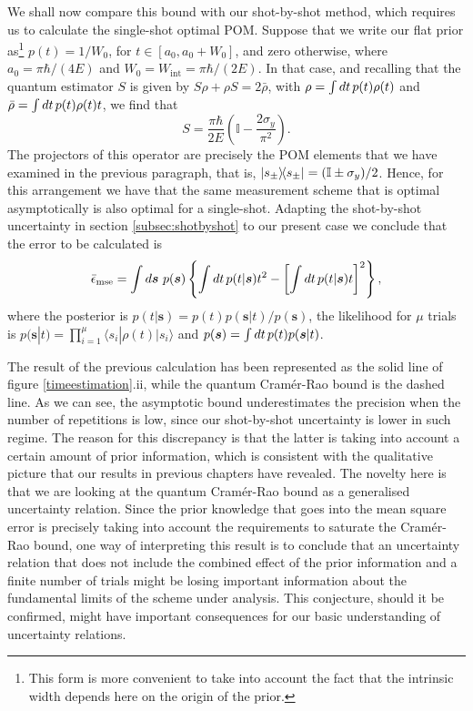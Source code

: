 We shall now compare this bound with our shot-by-shot method, which requires us to calculate the single-shot optimal POM. Suppose that we write our flat prior as\footnote{This form is more convenient to take into account the fact that the intrinsic width depends here on the origin of the prior.} $p(t) = 1/W_0$, for $t\in[a_0,a_0+W_0]$, and zero otherwise, where $a_0 = \pi\hbar/(4E)$ and $W_0 = W_{\mathrm{int}} = \pi\hbar/(2E)$. In that case, and recalling that the quantum estimator $S$ is given by $S\rho + \rho S = 2\bar{\rho}$, with $\rho = \int dt\hspace{0.15em} p(t)\rho(t)$ and $\bar{\rho} = \int dt\hspace{0.15em}p(t)\rho(t)t$, we find that 
\begin{equation}
S = \frac{\pi\hbar}{2E} \left(\mathbb{I}-\frac{2\sigma_y}{\pi^2}\right).
\end{equation}
The projectors of this operator are precisely the POM elements that we have examined in the previous paragraph, that is, $\ketbra{s_\pm} = (\mathbb{I} \pm \sigma_y)/2$. Hence, for this arrangement we have that the same measurement scheme that is optimal asymptotically is also optimal for a single-shot. Adapting the shot-by-shot uncertainty in section \ref{subsec:shotbyshot} to our present case we conclude that the error to be calculated is 
\begin{equation}
\bar{\epsilon}_{\mathrm{mse}} = \int d\boldsymbol{s}~p(\boldsymbol{s}) \left\lbrace \int dt\hspace{0.15em}p(t|\boldsymbol{s}) t^2 - \left[\int dt\hspace{0.15em} p(t|\boldsymbol{s}) t \right]^2 \right\rbrace,
\label{errortime}
\end{equation}
where the posterior is $p(t|\boldsymbol{s})= p(t) p(\boldsymbol{s}|t)/p(\boldsymbol{s})$, the likelihood for $\mu$ trials is $p(\boldsymbol{s}|t) = \prod_{i=1}^\mu \langle s_i | \rho(t) |s_i \rangle$ and $p(\boldsymbol{s}) = \int dt \hspace{0.15em}p(t)p(\boldsymbol{s}|t)$. 

The result of the previous calculation has been represented as the solid line of figure \ref{timeestimation}.ii, while the quantum Cram\'{e}r-Rao bound is the dashed line. As we can see, the asymptotic bound underestimates the precision when the number of repetitions is low, since our shot-by-shot uncertainty is lower in such regime. The reason for this discrepancy is that the latter is taking into account a certain amount of prior information, which is consistent with the qualitative picture that our results in previous chapters have revealed. The novelty here is that we are looking at the quantum Cram\'{e}r-Rao bound as a generalised uncertainty relation. Since the prior knowledge that goes into the mean square error is precisely taking into account the requirements to saturate the Cram\'{e}r-Rao bound, one way of interpreting this result is to conclude that an uncertainty relation that does not include the combined effect of the prior information and a finite number of trials might be losing important information about the fundamental limits of the scheme under analysis. This conjecture, should it be confirmed, might have important consequences for our basic understanding of uncertainty relations.  

